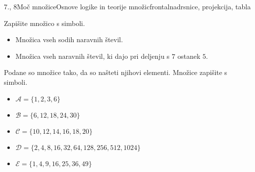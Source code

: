 \begin{priprava}{7., 8}{}{Moč množice}{Osnove logike in teorije množic}{frontalna}{drsnice, projekcija, tabla}
\begin{naloga}
    Zapišite množico s simboli.
    \begin{itemize}
        \item Množica vseh sodih naravnih števil.
        \item Množica vseh naravnih števil, ki dajo pri deljenju s $7$ ostanek $5$.
    \end{itemize}
\end{naloga}

\begin{naloga}
    Podane so množice tako, da so našteti njihovi elementi. Množice zapišite s simboli.
    \begin{itemize}
        \item $\mathcal{A}=\{1,2,3,6\}$
        \item $\mathcal{B}=\{6, 12, 18, 24, 30\}$
        \item $\mathcal{C}=\{10, 12, 14, 16, 18, 20\}$
        \item $\mathcal{D}=\{2, 4, 8, 16, 32, 64, 128, 256, 512, 1024\}$
        \item $\mathcal{E}=\{1,4,9,16,25,36,49\}$
    \end{itemize}
\end{naloga}



\end{priprava}